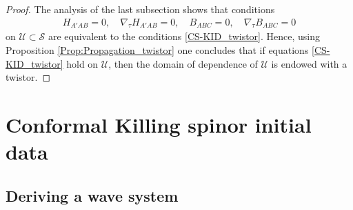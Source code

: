 \documentclass[10pt,a4paper]{article}
\theoremstyle{plain}
\begin{document}
{\begin{proof}
The analysis of the last subsection shows that  conditions
\begin{eqnarray*}
 H_{A'AB}=0, \quad \nabla_\tau  H_{A'AB}=0, \quad B_{ABC}=0, \quad \nabla_\tau  B_{ABC}=0
\end{eqnarray*}
on $\mathcal{U}\subset \mathcal{S}$ are equivalent to the conditions \eqref{CS-KID_twistor}. 
Hence, using Proposition \ref{Prop:Propagation_twistor} one concludes that if equations \eqref{CS-KID_twistor}
hold on $\mathcal{U}$, then the domain of dependence of $\mathcal{U}$ is endowed with a twistor.  
\end{proof}



}


  
\section{Conformal Killing spinor initial data}

\subsection{Deriving a wave system}
\end{document}
